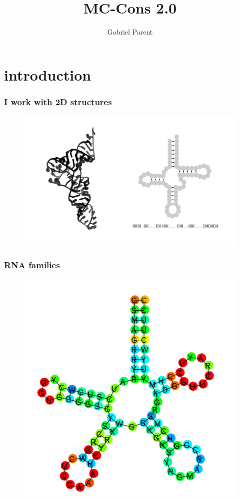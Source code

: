 \documentclass{beamer}
\title{MC-Cons 2.0}
\author{Gabriel Parent}
\begin{document}
\maketitle


\section{introduction}

\begin{frame}
	\frametitle{I work with 2D structures}
	\begin{figure}[!htb]
	\centering
	\includegraphics[scale=0.3]{figs/representations}
	\end{figure} 
\end{frame}

\begin{frame}
	\frametitle{RNA families}
	\begin{figure}
	\centering
	\includegraphics[scale=0.3]{figs/rfam}
	\end{figure}
\end{frame}
\end{document}
